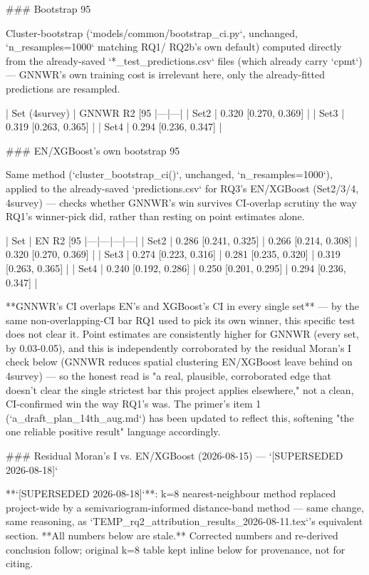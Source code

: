 ### Bootstrap 95%

Cluster-bootstrap (`models/common/bootstrap_ci.py`, unchanged, `n_resamples=1000` matching RQ1/
RQ2b's own default) computed directly from the already-saved `*_test_predictions.csv` files (which
already carry `cpmt`) — GNNWR's own training cost is irrelevant here, only the already-fitted
predictions are resampled.

| Set (4survey) | GNNWR R2 [95%
|---|---|
| Set2 | 0.320 [0.270, 0.369] |
| Set3 | 0.319 [0.263, 0.365] |
| Set4 | 0.294 [0.236, 0.347] |

### EN/XGBoost's own bootstrap 95%

Same method (`cluster_bootstrap_ci()`, unchanged, `n_resamples=1000`), applied to the already-saved
`predictions.csv` for RQ3's EN/XGBoost (Set2/3/4, 4survey) — checks whether GNNWR's win survives
CI-overlap scrutiny the way RQ1's winner-pick did, rather than resting on point estimates alone.

| Set | EN R2 [95%
|---|---|---|---|
| Set2 | 0.286 [0.241, 0.325] | 0.266 [0.214, 0.308] | 0.320 [0.270, 0.369] |
| Set3 | 0.274 [0.223, 0.316] | 0.281 [0.235, 0.320] | 0.319 [0.263, 0.365] |
| Set4 | 0.240 [0.192, 0.286] | 0.250 [0.201, 0.295] | 0.294 [0.236, 0.347] |

**GNNWR's CI overlaps EN's and XGBoost's CI in every single set** — by the same non-overlapping-CI
bar RQ1 used to pick its own winner, this specific test does not clear it. Point estimates are
consistently higher for GNNWR (every set, by 0.03-0.05), and this is independently corroborated by
the residual Moran's I check below (GNNWR reduces spatial clustering EN/XGBoost leave behind on
4survey) — so the honest read is "a real, plausible, corroborated edge that doesn't clear the
single strictest bar this project applies elsewhere," not a clean, CI-confirmed win the way RQ1's
was. The primer's item 1 (`a_draft_plan_14th_aug.md`) has been updated to reflect this, softening
"the one reliable positive result" language accordingly.

### Residual Moran's I vs. EN/XGBoost (2026-08-15) — `[SUPERSEDED 2026-08-18]`

**`[SUPERSEDED 2026-08-18]`**: k=8 nearest-neighbour method replaced project-wide by a
semivariogram-informed distance-band method — same change, same reasoning, as
`TEMP_rq2_attribution_results_2026-08-11.tex`'s equivalent section. **All numbers below are
stale.** Corrected numbers and re-derived conclusion follow; original k=8 table kept inline below
for provenance, not for citing.

